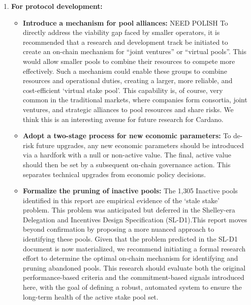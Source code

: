 \documentclass[11pt, letterpaper]{article}
\begin{document}
\begin{enumerate}
	\item \textbf{For protocol development:}
	      \begin{itemize}
		      \item \textbf{Introduce a mechanism for pool alliances:} NEED POLISH To directly address the viability gap faced by
		            smaller operators, it is recommended that a research and development track be initiated to create an
		            on-chain mechanism for ``joint ventures'' or ``virtual pools''. This would allow smaller pools to combine
		            their resources to compete more effectively. Such a mechanism could enable these groups to combine resources
		            and operational duties, creating a larger, more reliable, and cost-efficient
		            `virtual stake pool'. This capability is, of course, very common in the traditional markets, where companies
		            form consortia, joint ventures, and strategic alliances to pool resources and share risks. We think this is an interesting avenue for
		            future research for Cardano.
		      \item \textbf{Adopt a two-stage process for new economic parameters:} To de-risk future upgrades, any
		            new economic parameters should be introduced via a hardfork with a null or non-active value. The final,
		            active value should then be set by a subsequent on-chain governance action. This separates technical
		            upgrades from economic policy decisions.
		      \item \textbf{Formalize the pruning of inactive pools:}  The 1,305 Inactive pools identified in this report are empirical
		            evidence of the `stale stake' problem. This problem was anticipated but deferred in the Shelley-era
		            Delegation and Incentives Design Specification (SL-D1).This report moves beyond confirmation by proposing a more nuanced approach to
		            identifying these pools. Given that the problem predicted in the SL-D1 document is now materialized, we
		            recommend initiating a formal research effort to determine the optimal on-chain mechanism for identifying and
		            pruning abandoned pools. This research should evaluate both the original performance-based criteria and the
		            commitment-based signals introduced here, with the goal of defining a robust, automated system to ensure the
		            long-term health of the active stake pool set.
	      \end{itemize}


\end{enumerate}
\end{document}
